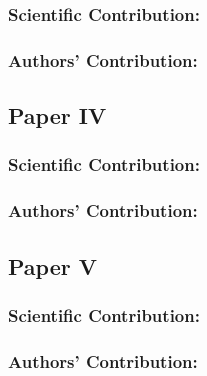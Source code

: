 \subsubsection*{Scientific Contribution:}%
%
\subsubsection*{Authors' Contribution:}%
%
    

\clearpage %

\subsection*{Paper IV}%
%
\begin{quote}
\end{quote}

\subsubsection*{Scientific Contribution:}%
%
\subsubsection*{Authors' Contribution:}%
%


\clearpage %

\subsection*{Paper V}%
%
\begin{quote}
\end{quote}

\subsubsection*{Scientific Contribution:}%
%
\subsubsection*{Authors' Contribution:}%
%


\clearpage %

